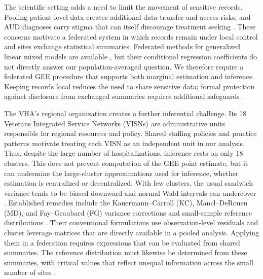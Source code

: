 \documentclass[12pt]{article}
\theoremstyle{remark}
\begin{document}
The scientific setting adds a need to limit the movement of sensitive records.
Pooling patient-level data creates additional data-transfer and access risks,
and AUD diagnoses carry stigma that can itself discourage treatment seeking
\citep{rieke2020future,keyes2010stigma}. These concerns motivate a federated
system in which records remain under local control and sites exchange
statistical summaries. Federated methods for generalized linear mixed models
are available \citep{yan2023privacy}, but their conditional regression
coefficients do not directly answer our population-averaged question.
We therefore require a federated GEE procedure that supports both marginal
estimation and inference. Keeping records local reduces the need to share
sensitive data; formal protection against disclosure from exchanged summaries
requires additional safeguards \citep{kairouz2021advances}.

The VHA's regional organization creates a further inferential challenge. Its
18 Veterans Integrated Service Networks (VISNs) are administrative units
responsible for regional resources and policy. Shared staffing policies and
practice patterns motivate treating each VISN as an independent unit in our
analysis. Thus, despite the large number of hospitalizations, inference rests
on only 18 clusters. This does not prevent computation of the GEE point
estimate, but it can undermine the large-cluster approximations used for
inference, whether estimation is centralized or decentralized. With few
clusters, the usual sandwich variance tends to be biased downward and normal
Wald intervals can undercover
\citep{mancl2001covariance,kauermann2001note}. Established remedies include the
Kauermann--Carroll (KC), Mancl--DeRouen (MD), and Fay--Graubard (FG) variance
corrections and small-sample reference distributions
\citep{kauermann2001note,mancl2001covariance,fay2001small,bell2002bias,liredden2015sandwich}.
Their conventional formulations use observation-level residuals and cluster
leverage matrices that are directly available in a pooled analysis. Applying
them in a federation requires expressions that can be evaluated from shared
summaries. The reference distribution must likewise be determined from these
summaries, with critical values that reflect unequal information across the
small number of sites
\citep{bell2002bias,imbens2016robust}.
\end{document}

